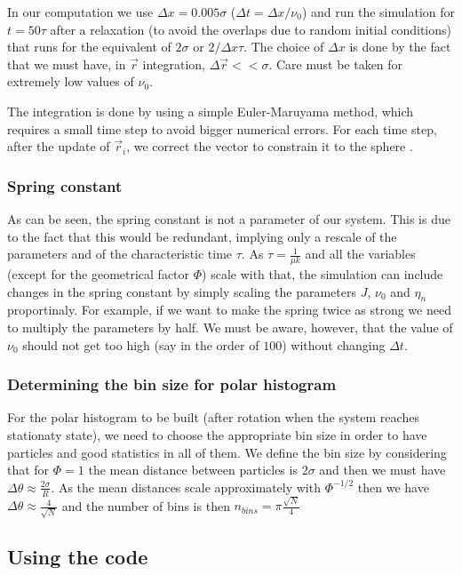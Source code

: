 \documentclass[12pt]{article}
\begin{document}
In our computation we use $\Delta x = 0.005 \sigma$ ($\Delta t = \Delta x/\nu_0$) and run the simulation for $t=50 \tau$ after a relaxation (to avoid the overlaps due to random initial conditions) that runs for the equivalent of $2 \sigma$ or  $2/\Delta x \tau$. The choice of $\Delta x$ is done by the fact that we must have, in $\vec{r}$ integration, $\Delta \vec{r} << \sigma$. Care must be taken for extremely low values of $\nu_0$.

The integration is done by using a simple Euler-Maruyama method, which requires a small time step to avoid bigger numerical errors. For each time step, after the update of $\vec{r}_i$, we correct the vector to constrain it to the sphere \cite{Sknepnek2014}.

\subsubsection{Spring constant}

As can be seen, the spring constant is not a parameter of our system. This is due to the fact that this would be redundant, implying only a rescale of the parameters and of the characteristic time $\tau$. As $\tau = \frac{1}{\mu k}$ and all the variables (except for the geometrical factor $\Phi$) scale with that, the simulation can include changes in the spring constant by simply scaling the parameters $J$, $\nu_0$ and $\eta_n$ proportinaly. For example, if we want to make the spring twice as strong we need to multiply the parameters by half. We must be aware, however, that the value of $\nu_0$ should not get too high (say in the order of $100$) without changing $\Delta t$.

\subsubsection{Determining the bin size for polar histogram}

For the polar histogram to be built (after rotation when the system reaches stationaty state), we need to choose the appropriate bin size in order to have particles and good statistics in all of them. We define the bin size by considering that for $\Phi=1$ the mean distance between particles is $2\sigma$ and then we must have $\Delta \theta \approx \frac{2\sigma}{R}$. As the mean distances scale approximately with $\Phi^{-1/2}$ then we have $\Delta \theta \approx \frac{4}{\sqrt{N}}$ and the number of bins is then $n_{bins} = \pi \frac{\sqrt{N}}{4}$

\subsection{Using the code}
\end{document}
